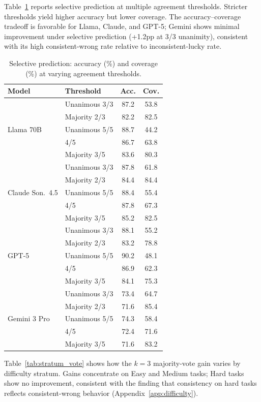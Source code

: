 \documentclass{article}
\begin{document}
Table~\ref{tab:selective_full} reports selective prediction at multiple agreement thresholds. Stricter thresholds yield higher accuracy but lower coverage. The accuracy--coverage tradeoff is favorable for Llama, Claude, and GPT-5; Gemini shows minimal improvement under selective prediction (+1.2pp at 3/3 unanimity), consistent with its high consistent-wrong rate relative to inconsistent-lucky rate.

\begin{table}[h]
\centering
\small
\caption{Selective prediction: accuracy (\%) and coverage (\%) at varying agreement thresholds.}
\label{tab:selective_full}
\scriptsize
\begin{tabular}{llcc}
\toprule
\textbf{Model} & \textbf{Threshold} & \textbf{Acc.} & \textbf{Cov.} \\
\midrule
\multirow{5}{*}{Llama 70B}
& Unanimous 3/3 & 87.2 & 53.8 \\
& Majority 2/3 & 82.2 & 82.5 \\
& Unanimous 5/5 & 88.7 & 44.2 \\
& 4/5 & 86.7 & 63.8 \\
& Majority 3/5 & 83.6 & 80.3 \\
\midrule
\multirow{5}{*}{Claude Son.\ 4.5}
& Unanimous 3/3 & 87.8 & 61.8 \\
& Majority 2/3 & 84.4 & 84.4 \\
& Unanimous 5/5 & 88.4 & 55.4 \\
& 4/5 & 87.8 & 67.3 \\
& Majority 3/5 & 85.2 & 82.5 \\
\midrule
\multirow{5}{*}{GPT-5}
& Unanimous 3/3 & 88.1 & 55.2 \\
& Majority 2/3 & 83.2 & 78.8 \\
& Unanimous 5/5 & 90.2 & 48.1 \\
& 4/5 & 86.9 & 62.3 \\
& Majority 3/5 & 84.1 & 75.3 \\
\midrule
\multirow{5}{*}{Gemini 3 Pro}
& Unanimous 3/3 & 73.4 & 64.7 \\
& Majority 2/3 & 71.6 & 85.4 \\
& Unanimous 5/5 & 74.3 & 58.4 \\
& 4/5 & 72.4 & 71.6 \\
& Majority 3/5 & 71.6 & 83.2 \\
\bottomrule
\end{tabular}
\end{table}

Table~\ref{tab:stratum_vote} shows how the $k\!=\!3$ majority-vote gain varies by difficulty stratum. Gains concentrate on Easy and Medium tasks; Hard tasks show no improvement, consistent with the finding that consistency on hard tasks reflects consistent-wrong behavior (Appendix~\ref{app:difficulty}).
\end{document}
